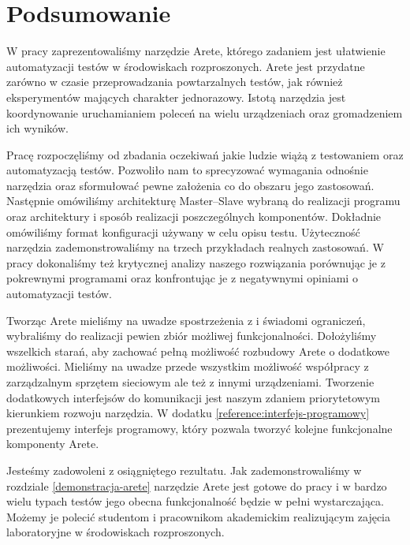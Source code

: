 \documentclass[00-praca-magisterska.tex]{subfiles}
\begin{document}
\chapter*{Podsumowanie}

W pracy zaprezentowaliśmy narzędzie Arete, którego zadaniem jest ułatwienie
automatyzacji testów w środowiskach rozproszonych. Arete jest przydatne zarówno
w czasie przeprowadzania powtarzalnych testów, jak również eksperymentów
mających charakter jednorazowy. Istotą narzędzia jest koordynowanie
uruchamianiem poleceń na wielu urządzeniach oraz gromadzeniem ich wyników.

Pracę rozpoczęliśmy od zbadania oczekiwań jakie ludzie wiążą z testowaniem oraz
automatyzacją testów. Pozwoliło nam to sprecyzować wymagania odnośnie narzędzia
oraz sformułować pewne założenia co do obszaru jego zastosowań.  Następnie
omówiliśmy architekturę Master--Slave wybraną do realizacji programu oraz
architektury i sposób realizacji poszczególnych komponentów. Dokładnie
omówiliśmy format konfiguracji używany w celu opisu testu. Użyteczność narzędzia
zademonstrowaliśmy na trzech przykładach realnych zastosowań. W pracy
dokonaliśmy też krytycznej analizy naszego rozwiązania porównując je z
pokrewnymi programami oraz konfrontując je z negatywnymi opiniami o
automatyzacji testów.

Tworząc Arete mieliśmy na uwadze spostrzeżenia z \cite{snake-oil} i
świadomi ograniczeń, wybraliśmy do realizacji pewien zbiór możliwej
funkcjonalności. Dołożyliśmy wszelkich starań, aby zachować pełną możliwość
rozbudowy Arete o dodatkowe możliwości. Mieliśmy na uwadze przede wszystkim
możliwość współpracy z zarządzalnym sprzętem sieciowym ale też z innymi
urządzeniami. Tworzenie dodatkowych interfejsów do komunikacji jest naszym
zdaniem priorytetowym kierunkiem rozwoju narzędzia. W dodatku \ref{reference:interfejs-programowy}
prezentujemy interfejs programowy, który pozwala tworzyć kolejne funkcjonalne
komponenty Arete.

Jesteśmy zadowoleni z osiągniętego rezultatu. Jak zademonstrowaliśmy w
rozdziale \ref{demonstracja-arete} narzędzie Arete jest gotowe do pracy i w
bardzo wielu typach testów jego obecna funkcjonalność będzie w pełni
wystarczająca.  Możemy je polecić studentom i pracownikom akademickim
realizującym zajęcia laboratoryjne w środowiskach rozproszonych.
\end{document}
